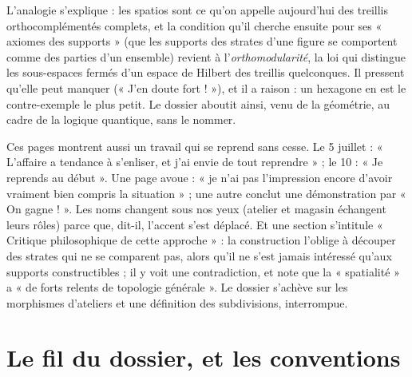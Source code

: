 \documentclass[11pt,a4paper]{article}
\begin{document}
\begin{resume}
L'analogie s'explique : les spatios sont ce qu'on appelle
aujourd'hui des treillis orthocomplémentés complets, et la condition qu'il
cherche ensuite pour ses « axiomes des supports » (que les supports des
strates d'une figure se comportent comme des parties d'un ensemble) revient
à l'\emph{orthomodularité}, la loi qui distingue les sous-espaces
fermés d'un espace de Hilbert des treillis quelconques. Il pressent qu'elle peut
manquer (« J'en doute fort ! »), et il a raison : un hexagone en est le
contre-exemple le plus petit. Le dossier aboutit ainsi, venu de la géométrie,
au cadre de la logique quantique, sans le nommer.

Ces pages montrent aussi un travail qui se reprend sans cesse. Le 5 juillet :
« L'affaire a tendance à s'enliser, et j'ai envie de tout reprendre » ; le 10 : « Je reprends au début ». Une page avoue : « je n'ai pas l'impression encore
d'avoir vraiment bien compris la situation » ; une autre conclut une
démonstration par « On gagne ! ». Les noms changent sous nos yeux (atelier et
magasin échangent leurs rôles) parce que, dit-il, l'accent s'est déplacé. Et
une section s'intitule « Critique philosophique de cette approche » : la
construction l'oblige à découper des strates qui ne se comparent pas, alors
qu'il ne s'est jamais intéressé qu'aux supports constructibles ; il y voit une
contradiction, et note que la « spatialité » a « de forts relents de topologie
générale ». Le dossier s'achève sur les morphismes d'ateliers et une définition
des subdivisions, interrompue.

\end{resume}

\section*{Le fil du dossier, et les conventions}
\end{document}
